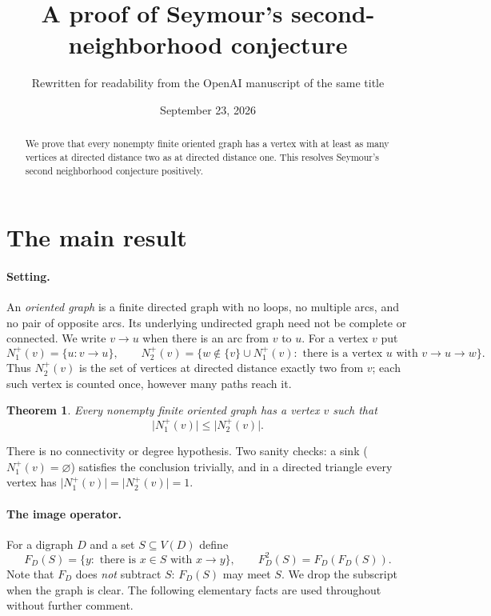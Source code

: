 \documentclass[11pt]{article}
\title{A proof of Seymour's second-neighborhood conjecture}
\author{Rewritten for readability from the OpenAI manuscript of the same title}
\date{September 23, 2026}
\newtheorem{theorem}{Theorem}[section]
\theoremstyle{remark}
\newcommand{\abs}[1]{\lvert #1\rvert}
\begin{document}
\maketitle
\begin{abstract}
We prove that every nonempty finite oriented graph has a vertex with at least
as many vertices at directed distance two as at directed distance one.
This resolves Seymour's second neighborhood conjecture positively.
\end{abstract}

\section{The main result}\label{sec:introduction}

\paragraph{Setting.}
An \emph{oriented graph} is a finite directed graph with no loops, no multiple
arcs, and no pair of opposite arcs. Its underlying undirected graph need not
be complete or connected. We write $v\to u$ when there is an arc from $v$ to
$u$. For a vertex $v$ put
\[
 N_1^+(v)=\{u:v\to u\},\qquad
 N_2^+(v)=\{w\notin\{v\}\cup N_1^+(v):
                 \text{ there is a vertex }u\text{ with }v\to u\to w\}.
\]
Thus $N_2^+(v)$ is the set of vertices at directed distance exactly two from
$v$; each such vertex is counted once, however many paths reach it.

\begin{theorem}\label{thm:main}
Every nonempty finite oriented graph has a vertex \(v\) such that
\[
 \abs{N_1^+(v)}\leq \abs{N_2^+(v)}.
\]
\end{theorem}

There is no connectivity or degree hypothesis. Two sanity checks: a sink
($N_1^+(v)=\varnothing$) satisfies the conclusion trivially, and in a directed
triangle every vertex has $\abs{N_1^+(v)}=\abs{N_2^+(v)}=1$.

\paragraph{The image operator.}
For a digraph $D$ and a set $S\subseteq V(D)$ define
\[
 F_D(S)=\{y:\text{ there is }x\in S\text{ with }x\to y\},
 \qquad F_D^2(S)=F_D(F_D(S)).
\]
Note that $F_D$ does \emph{not} subtract $S$: $F_D(S)$ may meet $S$. We
drop the subscript when the graph is clear. The following elementary facts
are used throughout without further comment.
\end{document}
